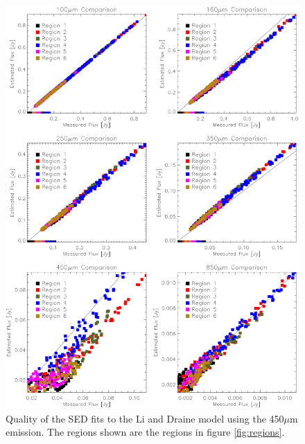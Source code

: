 \begin{figure}
  \centering
  \includegraphics[width=1.\textwidth]{sed_imgs/flux_compare_2_4.eps}
  \caption[Li and Draine Model SED Fit Quality Using 450$\mu$m Data]{Quality of the SED fits to the Li and Draine model using the 450$\mu$m emission.  The regions shown are the regions in figure \ref{fig:regions}.}
  \label{fig:w2_4}
\end{figure}

